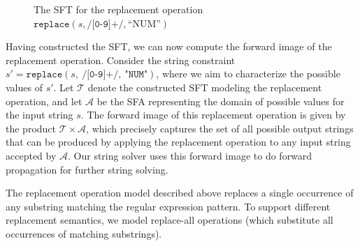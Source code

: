 \begin{figure}[h] \centering
  \caption{The SFT for the replacement operation \\ $\texttt{replace}(s, \texttt{/[0-9]+/}, \text{``NUM''})$}
  \label{fig-rearranged-automata}
  \end{figure}


  Having constructed the SFT, we can now compute the forward image of the replacement operation. Consider the string constraint $s' = \texttt{replace}(s,~\texttt{/[0-9]+/},~\text{"}\texttt{NUM}\text{"})$, where we aim to characterize the possible values of $s'$. Let $\mathcal{T}$ denote the constructed SFT modeling the replacement operation, and let $\mathcal{A}$ be the SFA representing the domain of possible values for the input string $s$. The forward image of this replacement operation is given by the product $\mathcal{T} \times \mathcal{A}$, which precisely captures the set of all possible output strings that can be produced by applying the replacement operation to any input string accepted by $\mathcal{A}$.
  Our string solver uses this forward image to do forward propagation for further string solving.

  
  The replacement operation model described above replaces a single occurrence of any substring matching the regular expression pattern. To support different replacement semantics, 
  we model replace-all operations (which substitute all occurrences of matching substrings).

